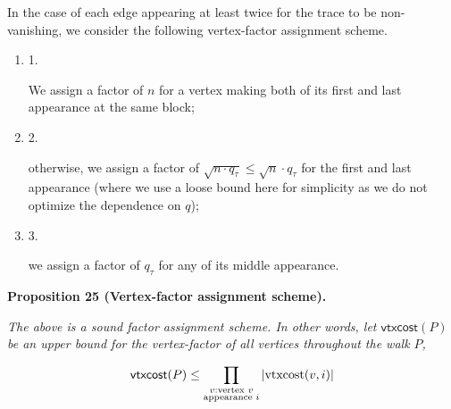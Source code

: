 In the case of each edge appearing at least twice for the trace to be non-vanishing, we consider the following vertex-factor assignment scheme.\par




\begin{enumerate}


\item[] 
1. 


We assign a factor of $n$ for a vertex making both of its first and last appearance at the same block;\par





\item[] 
2. 


otherwise, we assign a factor of $\sqrt{n\cdot q_{\tau}}\leq\sqrt{n}\cdot q_{\tau}$ for the first and last appearance (where we use a loose bound here for simplicity as we do not optimize the dependence on $q$);\par





\item[] 
3. 


we assign a factor of $q_{\tau}$ for any of its middle appearance.\par





\end{enumerate}





\par\medskip\noindent\textbf{
\textbf{Proposition 25}\textbf{ }(Vertex-factor assignment scheme)\textbf{.}
}\par



\emph{The above is a sound factor assignment scheme. In other words,
let $\mathsf{vtxcost}(P)$ be an upper bound for the vertex-factor of all vertices throughout the walk $P$,}\par


\[\begin{gathered}
\mathsf{vtxcost}(P)\leq\prod_{\begin{subarray}{c}v:\text{vertex }v\\
\text{appearance }i\end{subarray}}|\text{vtxcost}(v,i)|
\end{gathered}\]


